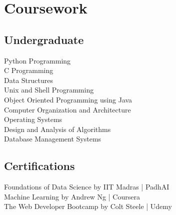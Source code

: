 \documentclass[]{deedy-resume-openfont}
\begin{document}
\begin{minipage}[t]{0.33\textwidth}

\section{Coursework}
\subsection{Undergraduate}
Python Programming \\
C Programming \\
Data Structures \\
Unix and Shell Programming \\
Object Oriented Programming using Java \\
Computer Organization and Architecture \\
Operating Systems \\
Design and Analysis of Algorithms \\
Database Management Systems \\
\sectionsep

\subsection{Certifications}
Foundations of Data Science by IIT Madras | PadhAI \\
Machine Learning by Andrew Ng | Coursera \\
The Web Developer Bootcamp by Colt Steele | Udemy \\


%
%

\end{minipage} 
\hfill
\end{document}
